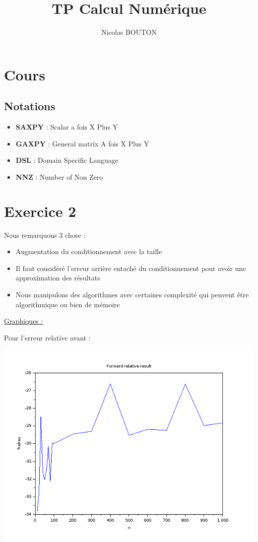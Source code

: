 \documentclass[12pt, letterpaper]{article}
\title{TP Calcul Numérique}
\author{Nicolas BOUTON}
\begin{document}
\maketitle

\section*{Cours}

\subsection*{Notations}

\begin{itemize}
\item \textbf{SAXPY} : Scalar a fois X Plus Y
\item \textbf{GAXPY} : General matrix A fois X Plus Y
\item \textbf{DSL} : Domain Specific Language
\item \textbf{NNZ} : Number of Non Zero
\end{itemize}

\section*{Exercice 2}

Nous remarquons 3 chose :

\begin{itemize}
\item Augmentation du conditionnement avec la taille
\item Il faut considéré l'erreur arrière entaché du conditionnement
  pour avoir une approximation des résultats
\item Nous manipulons des algorithmes avec certaines complexité qui
  peuvent être algorithmique ou bien de mémoire
\end{itemize}

\underline{Graphiques :} \newline

Pour l'erreur relative avant :

\includegraphics[scale=0.5]{img/frelres.png}
\end{document}
